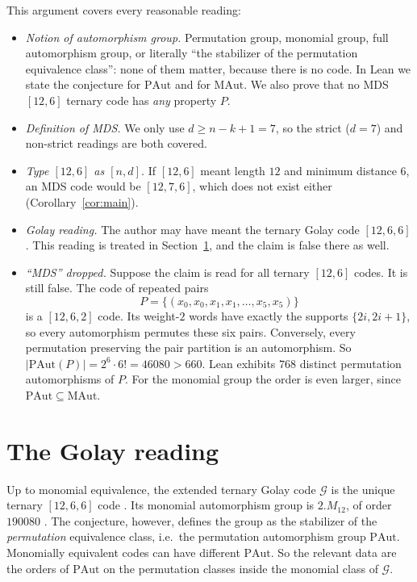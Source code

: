 \documentclass[11pt]{article}
\theoremstyle{remark}
\begin{document}
This argument covers every reasonable reading:
\begin{itemize}
\item \emph{Notion of automorphism group.} Permutation group, monomial group,
full automorphism group, or literally ``the stabilizer of the permutation
equivalence class'': none of them matter, because there is no code. In Lean we
state the conjecture for $\mathrm{PAut}$ and for $\mathrm{MAut}$. We also prove
that no MDS $[12,6]$ ternary code has \emph{any} property $P$.
\item \emph{Definition of MDS.} We only use $d\ge n-k+1=7$, so the strict
($d=7$) and non-strict readings are both covered.
\item \emph{Type $[12,6]$ as $[n,d]$.} If $[12,6]$ meant length $12$ and minimum
distance $6$, an MDS code would be $[12,7,6]$, which does not exist either
(Corollary~\ref{cor:main}).
\item \emph{Golay reading.} The author may have meant the ternary Golay code
$[12,6,6]$. This reading is treated in Section~\ref{sec:golay}, and the claim is
false there as well.
\item \emph{``MDS'' dropped.} Suppose the claim is read for all ternary
$[12,6]$ codes. It is still false. The code of repeated pairs
\[
P=\{(x_0,x_0,x_1,x_1,\dots,x_5,x_5)\}
\]
is a $[12,6,2]$ code. Its weight-$2$ words have exactly the supports
$\{2i,2i+1\}$, so every automorphism permutes these six pairs. Conversely,
every permutation preserving the pair partition is an automorphism. So
$|\mathrm{PAut}(P)|=2^6\cdot6!=46080>660$. Lean exhibits $768$ distinct
permutation automorphisms of $P$. For the monomial group the order is even larger,
since $\mathrm{PAut}\subseteq\mathrm{MAut}$.
\end{itemize}

\section{The Golay reading}\label{sec:golay}
Up to monomial equivalence, the extended ternary Golay code $\mathcal G$ is the
unique ternary $[12,6,6]$ code \cite{pless,dg}. Its monomial automorphism group is
$2.M_{12}$, of order $190080$ \cite{cs}. The conjecture, however, defines the
group as the stabilizer of the \emph{permutation} equivalence class, i.e.\ the
permutation automorphism group $\mathrm{PAut}$. Monomially equivalent codes can
have different $\mathrm{PAut}$. So the relevant data are the orders of
$\mathrm{PAut}$ on the permutation classes inside the monomial class of
$\mathcal G$.
\end{document}
